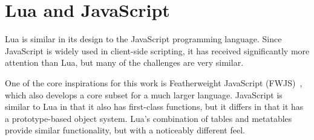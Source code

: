 

\section{Lua and JavaScript}
Lua is similar in its design to the JavaScript programming language.
Since JavaScript is widely used in client-side scripting,
it has received significantly more attention than Lua,
but many of the challenges are very similar.

One of the core inspirations for this work is Featherweight JavaScript (FWJS)~\cite{FWJS},
which also develops a core subset for a much larger language.
JavaScript is similar to Lua in that it also has first-class functions,
but it differs in that it has a prototype-based object system.
Lua's combination of tables and metatables provide similar functionality,
but with a noticeably different feel.




